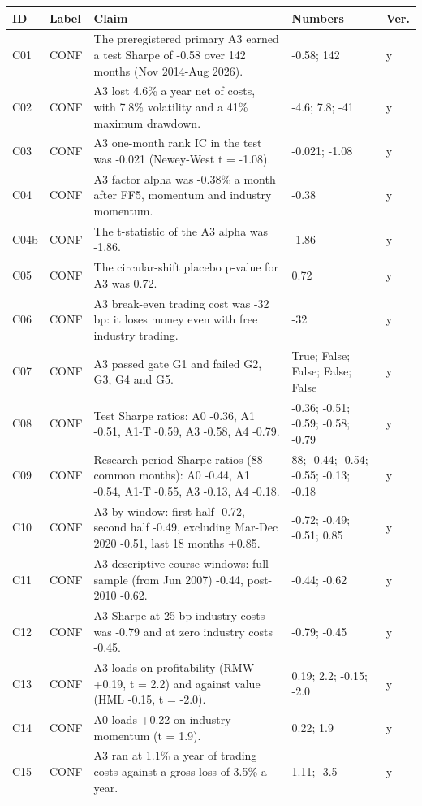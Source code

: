 {\scriptsize\setlength{\tabcolsep}{3pt}\begin{longtable}{@{}p{1.0cm}p{1.3cm}p{8.2cm}p{3.5cm}p{0.7cm}@{}}
\toprule ID & Label & Claim & Numbers & Ver. \\ \midrule \endhead
C01 & CONF & The preregistered primary A3 earned a test Sharpe of -0.58 over 142 months (Nov 2014-Aug 2026). & -0.58; 142 & y \\
C02 & CONF & A3 lost 4.6\% a year net of costs, with 7.8\% volatility and a 41\% maximum drawdown. & -4.6; 7.8; -41 & y \\
C03 & CONF & A3 one-month rank IC in the test was -0.021 (Newey-West t = -1.08). & -0.021; -1.08 & y \\
C04 & CONF & A3 factor alpha was -0.38\% a month after FF5, momentum and industry momentum. & -0.38 & y \\
C04b & CONF & The t-statistic of the A3 alpha was -1.86. & -1.86 & y \\
C05 & CONF & The circular-shift placebo p-value for A3 was 0.72. & 0.72 & y \\
C06 & CONF & A3 break-even trading cost was -32 bp: it loses money even with free industry trading. & -32 & y \\
C07 & CONF & A3 passed gate G1 and failed G2, G3, G4 and G5. & True; False; False; False; False & y \\
C08 & CONF & Test Sharpe ratios: A0 -0.36, A1 -0.51, A1-T -0.59, A3 -0.58, A4 -0.79. & -0.36; -0.51; -0.59; -0.58; -0.79 & y \\
C09 & CONF & Research-period Sharpe ratios (88 common months): A0 -0.44, A1 -0.54, A1-T -0.55, A3 -0.13, A4 -0.18. & 88; -0.44; -0.54; -0.55; -0.13; -0.18 & y \\
C10 & CONF & A3 by window: first half -0.72, second half -0.49, excluding Mar-Dec 2020 -0.51, last 18 months +0.85. & -0.72; -0.49; -0.51; 0.85 & y \\
C11 & CONF & A3 descriptive course windows: full sample (from Jun 2007) -0.44, post-2010 -0.62. & -0.44; -0.62 & y \\
C12 & CONF & A3 Sharpe at 25 bp industry costs was -0.79 and at zero industry costs -0.45. & -0.79; -0.45 & y \\
C13 & CONF & A3 loads on profitability (RMW +0.19, t = 2.2) and against value (HML -0.15, t = -2.0). & 0.19; 2.2; -0.15; -2.0 & y \\
C14 & CONF & A0 loads +0.22 on industry momentum (t = 1.9). & 0.22; 1.9 & y \\
C15 & CONF & A3 ran at 1.1\% a year of trading costs against a gross loss of 3.5\% a year. & 1.11; -3.5 & y \\

\end{longtable}}
